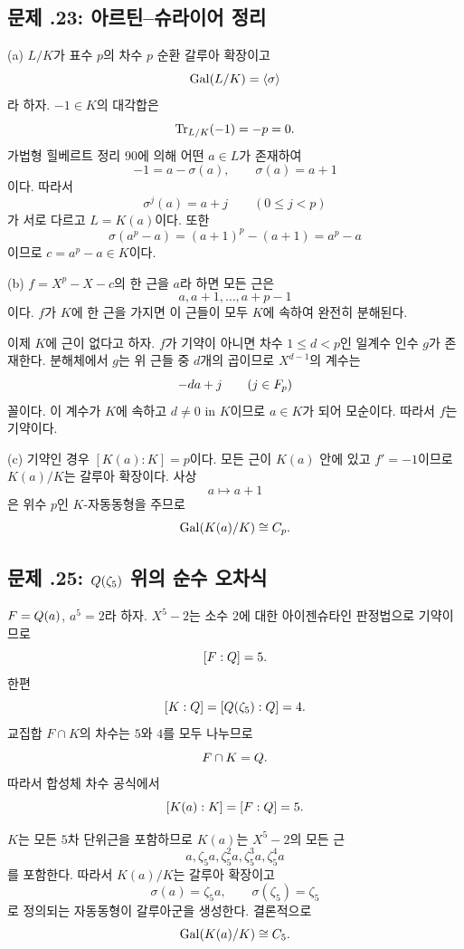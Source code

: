 \subsection*{문제 \thechapter.23: 아르틴--슈라이어 정리}

\begin{solution}
(a) $L/K$가 표수 $p$의 차수 $p$ 순환 갈루아 확장이고
\[
  \operatorname{Gal}(L/K)=\langle\sigma\rangle
\]
라 하자. $-1\in K$의 대각합은
\[
  \operatorname{Tr}_{L/K}(-1)=-p=0.
\]
가법형 힐베르트 정리 90에 의해 어떤 $a\in L$가 존재하여
\[
  -1=a-\sigma(a),
  \qquad
  \sigma(a)=a+1
\]
이다. 따라서
\[
  \sigma^j(a)=a+j
  \qquad(0\le j<p)
\]
가 서로 다르고 $L=K(a)$이다. 또한
\[
  \sigma(a^p-a)=(a+1)^p-(a+1)=a^p-a
\]
이므로 $c=a^p-a\in K$이다.

(b) $f=X^p-X-c$의 한 근을 $a$라 하면 모든 근은
\[
  a,a+1,\dots,a+p-1
\]
이다. $f$가 $K$에 한 근을 가지면 이 근들이 모두 $K$에 속하여 완전히 분해된다.

이제 $K$에 근이 없다고 하자. $f$가 기약이 아니면 차수 $1\le d<p$인 일계수 인수 $g$가 존재한다. 분해체에서 $g$는 위 근들 중 $d$개의 곱이므로 $X^{d-1}$의 계수는
\[
  -da+j
  \qquad(j\in F_p)
\]
꼴이다. 이 계수가 $K$에 속하고 $d\ne0$ in $K$이므로 $a\in K$가 되어 모순이다. 따라서 $f$는 기약이다.

(c) 기약인 경우 $[K(a):K]=p$이다. 모든 근이 $K(a)$ 안에 있고 $f'=-1$이므로 $K(a)/K$는 갈루아 확장이다. 사상
\[
  a\longmapsto a+1
\]
은 위수 $p$인 $K$-자동동형을 주므로
\[
  \operatorname{Gal}(K(a)/K)\cong C_p.
\]
\end{solution}

\subsection*{문제 \thechapter.25: $Q(\zeta_5)$ 위의 순수 오차식}

\begin{solution}
$F=Q(a)$, $a^5=2$라 하자. $X^5-2$는 소수 $2$에 대한 아이젠슈타인 판정법으로 기약이므로
\[
  [F:Q]=5.
\]
한편
\[
  [K:Q]=[Q(\zeta_5):Q]=4.
\]
교집합 $F\cap K$의 차수는 $5$와 $4$를 모두 나누므로
\[
  F\cap K=Q.
\]
따라서 합성체 차수 공식에서
\[
  [K(a):K]=[F:Q]=5.
\]

$K$는 모든 $5$차 단위근을 포함하므로 $K(a)$는 $X^5-2$의 모든 근
\[
  a,\zeta_5a,\zeta_5^2a,
  \zeta_5^3a,\zeta_5^4a
\]
를 포함한다. 따라서 $K(a)/K$는 갈루아 확장이고
\[
  \sigma(a)=\zeta_5a,
  \qquad
  \sigma(\zeta_5)=\zeta_5
\]
로 정의되는 자동동형이 갈루아군을 생성한다. 결론적으로
\[
  \operatorname{Gal}(K(a)/K)\cong C_5.
\]
\end{solution}

